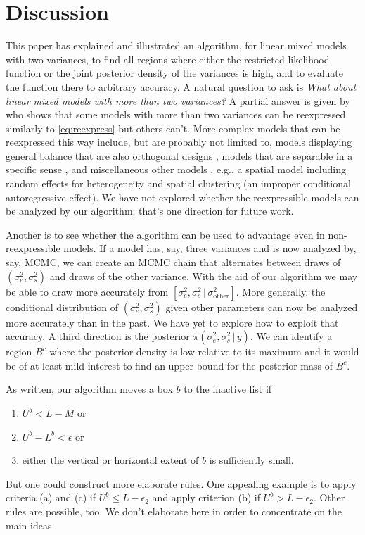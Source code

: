\documentclass{report}
\newcommand{\sigssq}{\sigma_s^2}
\newcommand{\sigesq}{\sigma_e^2}
\newcommand{\g}{\,|\,}
\begin{document}
\section{Discussion}
This paper has explained and illustrated an algorithm, for linear mixed models with two variances, to find all regions where either the restricted likelihood function or the joint posterior density of the variances is high, and to evaluate the function there to arbitrary accuracy.  A natural question to ask is \emph{What about linear mixed models with more than two variances?}  A partial answer is given by \cite{hodges:2013} who shows that some models with more than two variances can be reexpressed similarly to \eqref{eq:reexpress} but others can't.  More complex models that can be reexpressed this way include, but are probably not limited to, models displaying general balance that are also orthogonal designs \citep[all balanced ANOVAs plus other models;][]{houtman_speed:1983}, models that are separable in a specific sense \citep[Section 17.1.5]{hodges:2013}, and miscellaneous other models \citep[Section 17.1.5]{hodges:2013}, e.g., a spatial model including random effects for heterogeneity and spatial clustering (an improper conditional autoregressive effect). We have not explored whether the reexpressible models can be analyzed by our algorithm; that's one direction for future work.  

Another is to see whether the algorithm can be used to advantage even in non-reexpressible models.  If a model has, say, three variances and is now analyzed by, say, MCMC, we can create an MCMC chain that alternates between draws of $(\sigesq,\sigssq)$ and draws of the other variance.  With the aid of our algorithm we may be able to draw more accurately from $[\sigesq,\sigssq\g \sigma^2_\text{other}]$.  More generally, the conditional distribution of $(\sigesq,\sigssq)$ given other parameters can now be analyzed more accurately than in the past.  We have yet to explore how to exploit that accuracy.  A third direction is the posterior $\pi(\sigesq,\sigssq\g y)$.  We can identify a region $B^c$ where the posterior density is low relative to its maximum and it would be of at least mild interest to find an upper bound for the posterior mass of $B^c$.

As written, our algorithm moves a box $b$ to the inactive list if
\begin{enumerate}[label=(\alph*)]
\item $U^b < L-M$ or
\item $U^b - L^b < \epsilon$ or
\item either the vertical or horizontal extent of $b$ is sufficiently small.
\end{enumerate}
But one could construct more elaborate rules.  One appealing example is to apply criteria (a) and (c) if $U^b \le L-\epsilon_2$ and apply criterion (b) if $U^b > L-\epsilon_2$.  Other rules are possible, too.  We don't elaborate here in order to concentrate on the main ideas.
\end{document}
